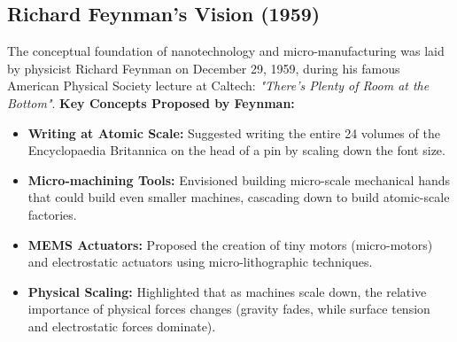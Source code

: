 \documentclass[12pt,a4paper]{article}
\begin{document}
\subsection{Richard Feynman's Vision (1959)}
The conceptual foundation of nanotechnology and micro-manufacturing was laid by physicist Richard Feynman on December 29, 1959, during his famous American Physical Society lecture at Caltech: \textit{"There's Plenty of Room at the Bottom"}.
\textbf{Key Concepts Proposed by Feynman:}
\begin{itemize}[leftmargin=*, itemsep=2.5pt]
  \item \textbf{Writing at Atomic Scale:} Suggested writing the entire 24 volumes of the Encyclopaedia Britannica on the head of a pin by scaling down the font size.
  \item \textbf{Micro-machining Tools:} Envisioned building micro-scale mechanical hands that could build even smaller machines, cascading down to build atomic-scale factories.
  \item \textbf{MEMS Actuators:} Proposed the creation of tiny motors (micro-motors) and electrostatic actuators using micro-lithographic techniques.
  \item \textbf{Physical Scaling:} Highlighted that as machines scale down, the relative importance of physical forces changes (gravity fades, while surface tension and electrostatic forces dominate).
\end{itemize}
\end{document}
